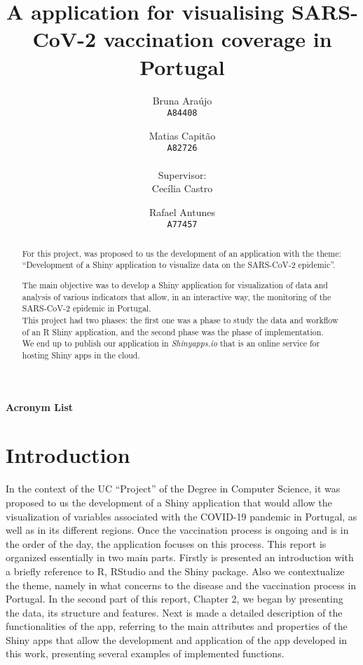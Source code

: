 \documentclass[11pt,a4paper]{report}
\title{A \Shiny application for visualising SARS-CoV-2 vaccination coverage in Portugal}
\author{
  Bruna Araújo\\
  \texttt{A84408}
  \and
  Matias Capitão\\
  \texttt{A82726} \\ 
  \\ Supervisor:\\
  Cecília Castro\\
  \and
  Rafael Antunes\\
  \texttt{A77457}
}
\date{}
\begin{document}
\maketitle

\begin{abstract}
    For this project, was proposed to us the development of an application with the theme: “Development of a Shiny application to visualize data on the SARS-CoV-2 epidemic”.
    
    
    The main objective was to develop a Shiny application for visualization
    of data and analysis of various indicators that allow, in an interactive way, the monitoring of the
    SARS-CoV-2 epidemic in Portugal. \\
    This project had two phases: the first one was a phase to study the data and workflow of an R Shiny application, and the second phase was the phase of implementation.\\
    We end up to publish our application in \textit{Shinyapps.io} that is an online service for hosting Shiny apps in the cloud.
    
    
     
    






    

    
    
    

\end{abstract}

\tableofcontents
\newpage

\listoffigures
\newpage

\newpage

{\huge\textbf{Acronym List}}\\



\chapter{Introduction}
In the context of the UC “Project” of the Degree in Computer Science, it was proposed to us the development of a Shiny application that would allow the visualization of variables associated with the COVID-19 pandemic in Portugal, as well as in its different regions. Once the vaccination process is ongoing and is in the order of the day, the application focuses on this process. 
This report is organized essentially in two main  parts. Firstly is presented an introduction with a briefly reference to R, RStudio and the Shiny package. Also we  contextualize the theme, namely in what concerns to the disease and the vaccination process in Portugal.
In the second part of this report, Chapter 2, we began by presenting the data,  its structure and features. Next is made a detailed description of the functionalities of the app, referring to the main attributes and properties of the Shiny apps that allow the development and application of the app developed in this work, presenting several examples of  implemented functions.
\end{document}
